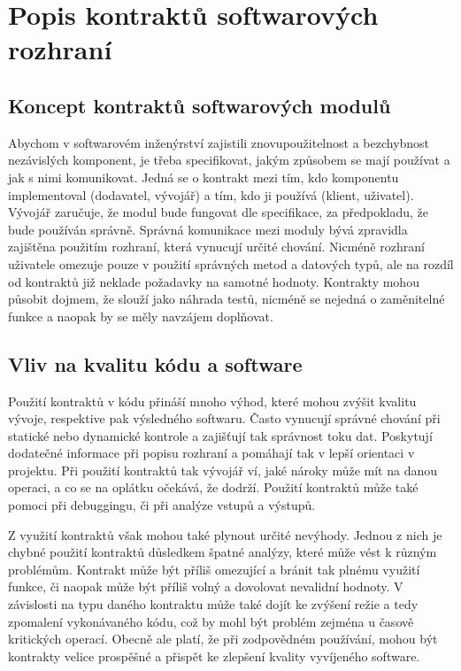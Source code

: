 \chapter{Popis kontraktů softwarových rozhraní}

	\section{Koncept kontraktů softwarových modulů}
		Abychom v softwarovém inženýrství zajistili znovupoužitelnost a bezchybnost nezávislých komponent, je třeba specifikovat, jakým způsobem se mají používat a jak s nimi komunikovat. Jedná se o kontrakt mezi tím, kdo komponentu implementoval (dodavatel, vývojář) a tím, kdo ji používá (klient, uživatel). Vývojář zaručuje, že modul bude fungovat dle specifikace, za předpokladu, že bude používán správně. Správná komunikace mezi moduly bývá zpravidla zajištěna použitím rozhraní, která vynucují určité chování. Nicméně rozhraní uživatele omezuje pouze v použití správných metod a datových typů, ale na rozdíl od kontraktů již neklade požadavky na samotné hodnoty. Kontrakty mohou působit dojmem, že slouží jako náhrada testů, nicméně se nejedná o zaměnitelné funkce a naopak by se měly navzájem doplňovat. 
		
	\section{Vliv na kvalitu kódu a software}
		Použití kontraktů v kódu přináší mnoho výhod, které mohou zvýšit kvalitu vývoje, respektive pak výsledného softwaru. Často vynucují správné chování při statické nebo dynamické kontrole a zajišťují tak správnost toku dat. Poskytují dodatečné informace při popisu rozhraní a pomáhají tak v lepší orientaci v projektu. Při použití kontraktů tak vývojář ví, jaké nároky může mít na danou operaci, a co se na oplátku očekává, že dodrží. Použití kontraktů může také pomoci při debuggingu, či při analýze vstupů a výstupů. 
		
		Z využití kontraktů však mohou také plynout určité nevýhody. Jednou z nich je chybné použití kontraktů důsledkem špatné analýzy, které může vést k různým problémům. Kontrakt  může být příliš omezující a bránit tak plnému využití funkce, či naopak může být příliš volný a dovolovat nevalidní hodnoty. V závislosti na typu daného kontraktu může také dojít ke zvýšení režie a tedy zpomalení vykonávaného kódu, což by mohl být problém zejména u časově kritických operací. Obecně ale platí, že při zodpovědném používání, mohou být kontrakty velice prospěšné a přispět ke zlepšení kvality vyvíjeného software.
	
